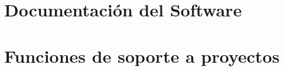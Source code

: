 \documentclass[11pt,a4paper,spanish,twoside]{report}
\begin{document}
\section{Documentación del Software}
\section{Funciones de soporte a proyectos}




\end{document}
